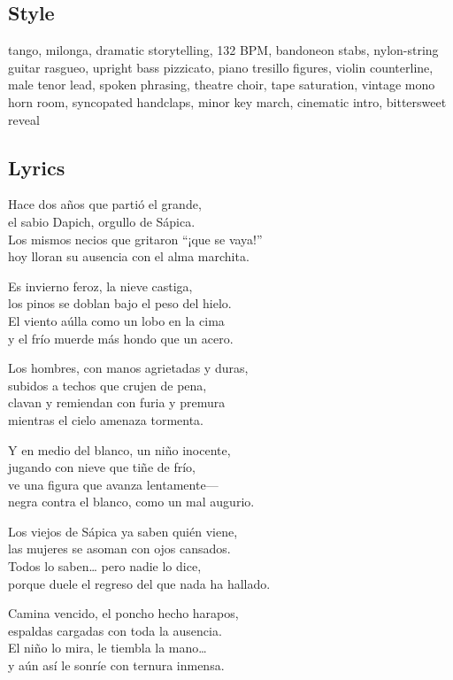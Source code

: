 \documentclass[]{article}
\begin{document}
\subsection{Style}\label{style-36}

tango, milonga, dramatic storytelling, 132 BPM, bandoneon stabs,
nylon-string guitar rasgueo, upright bass pizzicato, piano tresillo
figures, violin counterline, male tenor lead, spoken phrasing, theatre
choir, tape saturation, vintage mono horn room, syncopated handclaps,
minor key march, cinematic intro, bittersweet reveal

\subsection{Lyrics}\label{lyrics-36}

Hace dos años que partió el grande,\\
el sabio Dapich, orgullo de Sápica.\\
Los mismos necios que gritaron ``¡que se vaya!''\\
hoy lloran su ausencia con el alma marchita.

Es invierno feroz, la nieve castiga,\\
los pinos se doblan bajo el peso del hielo.\\
El viento aúlla como un lobo en la cima\\
y el frío muerde más hondo que un acero.

Los hombres, con manos agrietadas y duras,\\
subidos a techos que crujen de pena,\\
clavan y remiendan con furia y premura\\
mientras el cielo amenaza tormenta.

Y en medio del blanco, un niño inocente,\\
jugando con nieve que tiñe de frío,\\
ve una figura que avanza lentamente---\\
negra contra el blanco, como un mal augurio.

Los viejos de Sápica ya saben quién viene,\\
las mujeres se asoman con ojos cansados.\\
Todos lo saben\ldots{} pero nadie lo dice,\\
porque duele el regreso del que nada ha hallado.

Camina vencido, el poncho hecho harapos,\\
espaldas cargadas con toda la ausencia.\\
El niño lo mira, le tiembla la mano\ldots{}\\
y aún así le sonríe con ternura inmensa.
\end{document}
